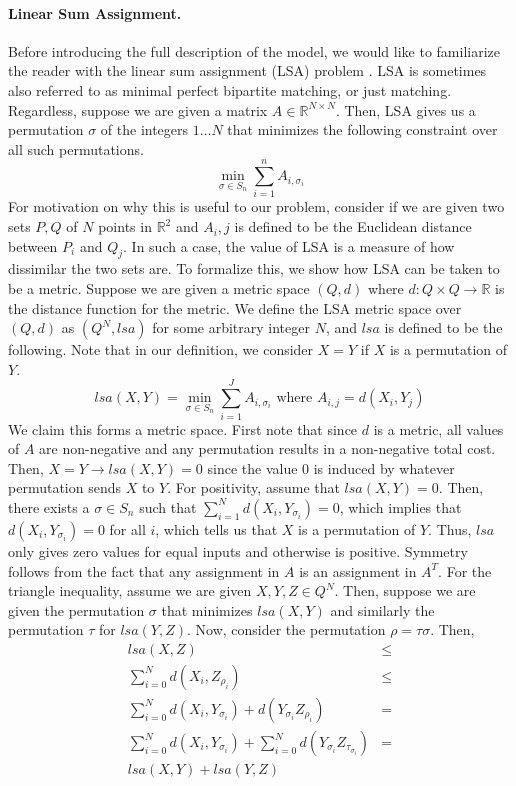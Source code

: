 \documentclass{article}
\begin{document}
\paragraph{Linear Sum Assignment.}
Before introducing the full description of the model, we would like to familiarize the reader with the linear sum assignment (LSA) problem \cite{linearsumassignment}. LSA is sometimes also referred to as minimal perfect bipartite matching, or just matching. Regardless, suppose we are given a matrix $A \in \mathbb{R}^{N \times N}$. Then, LSA gives us a permutation $\sigma$ of the integers $1 \ldots N$ that minimizes the following constraint over all such permutations.
\[
    \min_{\sigma \in S_{n}} \sum_{i = 1}^{n} A_{i, \sigma_i}
\]
For motivation on why this is useful to our problem, consider if we are given two sets $P, Q$ of $N$ points in $\mathbb{R}^2$ and $A_i,j$ is defined to be the Euclidean distance between $P_i$ and $Q_j$. In such a case, the value of LSA is a measure of how dissimilar the two sets are. To formalize this, we show how LSA can be taken to be a metric. Suppose we are given a metric space $(Q, d)$ where $d: Q \times Q \to \mathbb{R}$ is the distance function for the metric. We define the LSA metric space over $(Q,d)$ as $(Q^{N}, lsa)$ for some arbitrary integer $N$, and $lsa$ is defined to be the following. Note that in our definition, we consider $X = Y$ if $X$ is a permutation of $Y$.
\[
    lsa(X,Y) = \min_{\sigma \in S_{n}} \sum_{i = 1}^{J} A_{i, \sigma_i} \text{ where } A_{i, j} = d(X_i, Y_{j})
\]
We claim this forms a metric space. First note that since $d$ is a metric, all values of $A$ are non-negative and any permutation results in a non-negative total cost. Then, $X = Y \to lsa(X,Y) = 0$ since the value $0$ is induced by whatever permutation sends $X$ to $Y$. For positivity, assume that $lsa(X, Y) = 0$. Then, there exists a $\sigma \in S_n$ such that $\sum_{i = 1}^{N}d(X_i, Y_{\sigma_{i}}) = 0$, which implies that $d(X_i, Y_{\sigma_{i}}) = 0$ for all $i$, which tells us that $X$ is a permutation of $Y$. Thus, $lsa$ only gives zero values for equal inputs and otherwise is positive. Symmetry follows from the fact that any assignment in $A$ is an assignment in $A^{T}$. For the triangle inequality, assume we are given $X, Y, Z \in Q^{N}$. Then, suppose we are given the permutation $\sigma$ that minimizes $lsa(X, Y)$ and similarly the permutation $\tau$ for $lsa(Y, Z)$. Now, consider the permutation $\rho = \tau\sigma$. Then,
\begin{align*}
    lsa(X, Z) & \le \\
    \sum_{i = 0}^{N}d(X_{i}, Z_{\rho_{i}}) & \le \\
    \sum_{i = 0}^{N}d(X_{i}, Y_{\sigma_{i}}) + d(Y_{\sigma_{i}}Z_{\rho_{i}}) & = \\
    \sum_{i = 0}^{N}d(X_{i}, Y_{\sigma_{i}}) + \sum_{i = 0}^{N} d(Y_{\sigma_{i}}Z_{\tau_{\sigma_{i}}}) & = \\
    lsa(X, Y) + lsa(Y, Z)
\end{align*}
\end{document}
